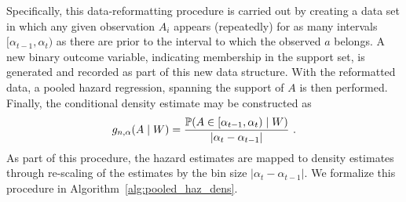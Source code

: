 Specifically, this data-reformatting procedure is carried out by creating a data
set in which any given observation $A_i$ appears (repeatedly) for as many
intervals $[\alpha_{t-1}, \alpha_t)$ as there are prior to the interval to which
the observed $a$ belongs. A new binary outcome variable, indicating membership
in the support set, is generated and recorded as part of this new data
structure. With the reformatted data, a pooled hazard regression, spanning the
support of $A$ is then performed. Finally, the conditional density estimate may
be constructed as
\begin{equation*}
   g_{n, \alpha}(A \mid W) = \frac{\mathbb{P}(A \in [\alpha_{t-1}, \alpha_t)
      \mid W)}{\lvert \alpha_t - \alpha_{t-1} \rvert} \ .
\end{equation*}
As part of this procedure, the hazard estimates are mapped to density estimates
through re-scaling of the estimates by the bin size $\lvert \alpha_t
- \alpha_{t-1} \rvert$. We formalize this procedure in
Algorithm~\ref{alg:pooled_haz_dens}.\\

